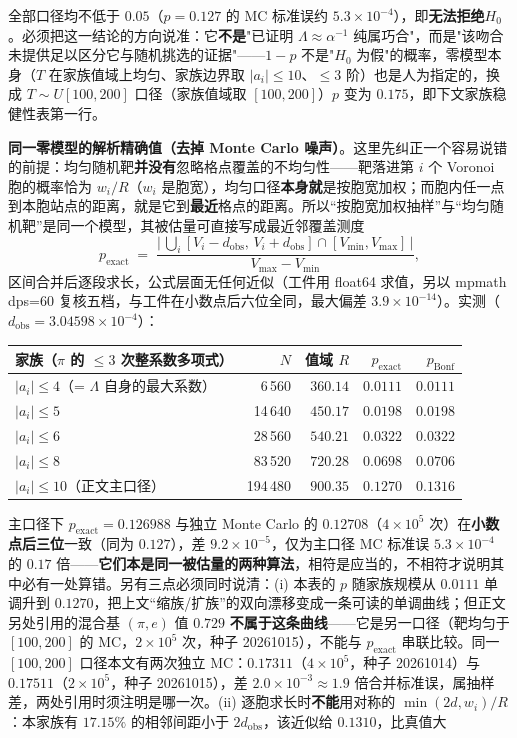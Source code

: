 \documentclass[12pt,a4paper]{article}
\begin{document}
\begin{enumerate}
  全部口径均不低于 $0.05$（$p=0.127$ 的 MC 标准误约 $5.3\times10^{-4}$），即\textbf{无法拒绝}$H_0$。必须把这一结论的方向说准：它\textbf{不是}"已证明 $\Lambda \approx \alpha^{-1}$ 纯属巧合"，而是"该吻合未提供足以区分它与随机挑选的证据"——$1-p$ 不是"$H_0$ 为假"的概率，零模型本身（$T$ 在家族值域上均匀、家族边界取 $\lvert a_i\rvert\le10$、$\le3$ 阶）也是人为指定的，换成 $T\sim U[100,200]$ 口径（家族值域取 $[100,200]$）$p$ 变为 $0.175$，即下文家族稳健性表第一行。\par\medskip\noindent\textbf{同一零模型的解析精确值（去掉 Monte Carlo 噪声）}。这里先纠正一个容易说错的前提：均匀随机靶\textbf{并没有}忽略格点覆盖的不均匀性——靶落进第 $i$ 个 Voronoi 胞的概率恰为 $w_i/R$（$w_i$ 是胞宽），均匀口径\textbf{本身就}是按胞宽加权；而胞内任一点到本胞站点的距离，就是它到\textbf{最近}格点的距离。所以“按胞宽加权抽样”与“均匀随机靶”是同一个模型，其被估量可直接写成最近邻覆盖测度\[ p_{\mathrm{exact}} \;=\; \frac{\bigl|\,\bigcup_i [V_i-d_{\mathrm{obs}},\,V_i+d_{\mathrm{obs}}] \cap [V_{\min},V_{\max}]\,\bigr|}{V_{\max}-V_{\min}}, \]区间合并后逐段求长，公式层面无任何近似（工件用 float64 求值，另以 mpmath dps=60 复核五档，与工件在小数点后六位全同，最大偏差 $3.9\times10^{-14}$）。实测（$d_{\mathrm{obs}} = 3.04598\times10^{-4}$）：\begin{center}\footnotesize\begin{tabular}{@{}lrrrr@{}}\toprule\textbf{家族（$\pi$ 的 $\le3$ 次整系数多项式）} & $N$ & 值域 $R$ & $p_{\mathrm{exact}}$ & $p_{\mathrm{Bonf}}$ \\\midrule$\lvert a_i\rvert\le 4$（= $\Lambda$ 自身的最大系数） & 6\,560 & $360.14$ & $0.0111$ & $0.0111$ \\$\lvert a_i\rvert\le 5$ & 14\,640 & $450.17$ & $0.0198$ & $0.0198$ \\$\lvert a_i\rvert\le 6$ & 28\,560 & $540.21$ & $0.0322$ & $0.0322$ \\$\lvert a_i\rvert\le 8$ & 83\,520 & $720.28$ & $0.0698$ & $0.0706$ \\$\lvert a_i\rvert\le 10$（正文主口径） & 194\,480 & $900.35$ & $\mathbf{0.1270}$ & $0.1316$ \\\bottomrule\end{tabular}\end{center}\noindent 主口径下 $p_{\mathrm{exact}} = 0.126988$ 与独立 Monte Carlo 的 $0.12708$（$4\times10^5$ 次）在\textbf{小数点后三位}一致（同为 $0.127$），差 $9.2\times10^{-5}$，仅为主口径 MC 标准误 $5.3\times10^{-4}$ 的 $0.17$ 倍——\textbf{它们本是同一被估量的两种算法}，相符是应当的，不相符才说明其中必有一处算错。另有三点必须同时说清：(i) 本表的 $p$ 随家族规模从 $0.0111$ 单调升到 $0.1270$，把上文“缩族/扩族”的双向漂移变成一条可读的单调曲线；但正文另处引用的混合基 $(\pi,e)$ 值 $0.729$ \textbf{不属于这条曲线}——它是另一口径（靶均匀于 $[100,200]$ 的 MC，$2\times10^5$ 次，种子 20261015），不能与 $p_{\mathrm{exact}}$ 串联比较。同一 $[100,200]$ 口径本文有两次独立 MC：$0.17311$（$4\times10^5$，种子 20261014）与 $0.17511$（$2\times10^5$，种子 20261015），差 $2.0\times10^{-3}\approx1.9$ 倍合并标准误，属抽样差，两处引用时须注明是哪一次。(ii) 逐胞求长时\textbf{不能}用对称的 $\min(2d,w_i)/R$：本家族有 $17.15\%$ 的相邻间距小于 $2d_{\mathrm{obs}}$，该近似给 $0.1310$，比真值大 
\end{enumerate}
\end{document}
